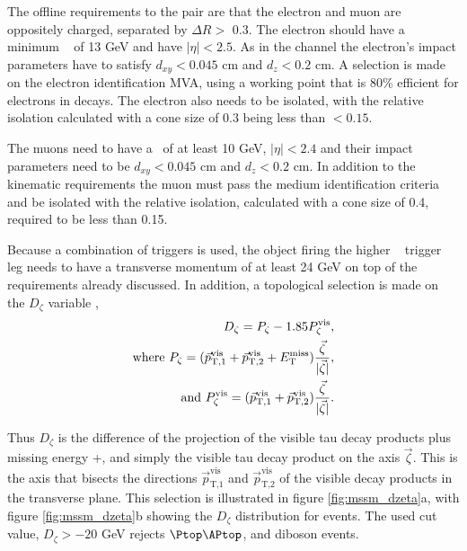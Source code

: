 The offline requirements to the \emu pair are that the electron 
and muon are oppositely charged, separated by $\Delta R >$ 0.3. The 
electron should have a minimum \pT~ of 13 GeV and have $|\eta|< 2.5$. As
in the \etau channel the electron's impact parameters have to 
satisfy $d_{xy} < 0.045$ cm and $d_{z}<0.2$ cm. A selection is
made on the electron identification MVA, using a working point that 
is 80\% efficient for electrons in \Zee decays. The electron
also needs to be isolated, with the relative isolation calculated
with a cone size of 0.3 being less than $<0.15$.

The muons need to have a \pT~of at least 10 GeV, $|\eta|<2.4$ and 
their impact parameters need to be $d_{xy}<0.045$ cm and $d_{z}<0.2$ cm.
In addition to the kinematic requirements the muon must
pass the medium identification criteria and be isolated with the relative
isolation, calculated with a cone size of 0.4, required to be less than 0.15.

Because a combination of triggers is used, the object firing
the higher \pT~ trigger leg needs to have a transverse momentum
of at least 24 GeV on top of the requirements already discussed.
In addition, a topological selection is made on the $D_{\zeta}$ variable \cite{cdf-dzeta},
\begin{align}\label{eqn:mssm_em_dzeta}
D_{\zeta} = P_{\zeta} - 1.85 P_{\zeta}^{\text{vis}}, \notag \\
\text{where } P_{\zeta} = (\vec{p}_{\text{T},1}^{\text{vis}} + \vec{p}_{\text{T},2}^{\text{vis}} + E_{\text{T}}^{\text{miss}})\frac{\vec{\zeta}}{|\vec{\zeta}|}, \notag \\
\text{and } P_{\zeta}^{\text{vis}} = (\vec{p}_{\text{T},1}^{\text{vis}}+\vec{p}_{\text{T},2}^{\text{vis}})\frac{\vec{\zeta}}{|\vec{\zeta}|}.
\end{align}

Thus $D_{\zeta}$ is the difference of the projection of the visible tau decay products plus missing energy \pT+\MET,
and simply the visible tau decay product \pT on the axis $\vec{\zeta}$. This is the axis that bisects 
the directions $\vec{p}_{\text{T,1}}^{\text{vis}}$ and $\vec{p}_{\text{T,2}}^{\text{vis}}$
of the visible decay products in the transverse plane. This selection is illustrated in figure
\ref{fig:mssm_dzeta}a, with figure \ref{fig:mssm_dzeta}b showing the $D_{\zeta}$ distribution
for \emu events. The used cut value, $D_{\zeta} > -20$ GeV rejects $\ttbar$, \Wjets and diboson
events. 

